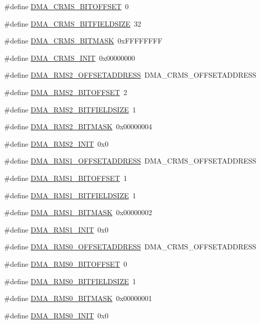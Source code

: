 \begin{DoxyCompactItemize}
\#define \hyperlink{a00547_af2bcab329158e22243dd9ad3b44debd0}{DMA\_\-CRMS\_\-BITOFFSET}~0
\item 
\#define \hyperlink{a00547_a2e7e27db7c47366e6c23b0c3d98e7426}{DMA\_\-CRMS\_\-BITFIELDSIZE}~32
\item 
\#define \hyperlink{a00547_a3caa1ec0922839b9befe7c804a7a4e7b}{DMA\_\-CRMS\_\-BITMASK}~0xFFFFFFFF
\item 
\#define \hyperlink{a00547_a2ed4d76d0f76f21be3cadc602c0a1125}{DMA\_\-CRMS\_\-INIT}~0x00000000
\item 
\#define \hyperlink{a00547_a4963a9bfd5c5dd08132f7bfa8da05583}{DMA\_\-RMS2\_\-OFFSETADDRESS}~DMA\_\-CRMS\_\-OFFSETADDRESS
\item 
\#define \hyperlink{a00547_ac40999a5d03946f8f9ae30b9918013a4}{DMA\_\-RMS2\_\-BITOFFSET}~2
\item 
\#define \hyperlink{a00547_a9476c50057bc6010fd8ddc59dcca2b66}{DMA\_\-RMS2\_\-BITFIELDSIZE}~1
\item 
\#define \hyperlink{a00547_a6ffdb406a6ebfe102c8162fe72fcc2af}{DMA\_\-RMS2\_\-BITMASK}~0x00000004
\item 
\#define \hyperlink{a00547_a550649debe6017fa73f1f4b1d788d85d}{DMA\_\-RMS2\_\-INIT}~0x0
\item 
\#define \hyperlink{a00547_adb3fdf021da84959e8e6b79e5005f1fa}{DMA\_\-RMS1\_\-OFFSETADDRESS}~DMA\_\-CRMS\_\-OFFSETADDRESS
\item 
\#define \hyperlink{a00547_a0e0ffe41bd1e2055978844ea0d5ca479}{DMA\_\-RMS1\_\-BITOFFSET}~1
\item 
\#define \hyperlink{a00547_a2410508b4a08a0f86d6a0be09e3b57a5}{DMA\_\-RMS1\_\-BITFIELDSIZE}~1
\item 
\#define \hyperlink{a00547_a7a3dc6c9367c782aef23aef7c763a806}{DMA\_\-RMS1\_\-BITMASK}~0x00000002
\item 
\#define \hyperlink{a00547_acaee22bc62c9866ff41a7b47bcb54355}{DMA\_\-RMS1\_\-INIT}~0x0
\item 
\#define \hyperlink{a00547_aedeb04809cfbf6d0c2dc3bd5d503d470}{DMA\_\-RMS0\_\-OFFSETADDRESS}~DMA\_\-CRMS\_\-OFFSETADDRESS
\item 
\#define \hyperlink{a00547_a6ebf67c449c9c00749228c4f304fb640}{DMA\_\-RMS0\_\-BITOFFSET}~0
\item 
\#define \hyperlink{a00547_aa01b985a3b6babbd3ec5c020fe03662a}{DMA\_\-RMS0\_\-BITFIELDSIZE}~1
\item 
\#define \hyperlink{a00547_af253ac96297350671140c674f6c04b98}{DMA\_\-RMS0\_\-BITMASK}~0x00000001
\item 
\#define \hyperlink{a00547_ac4aee16fc5d09a3013a79bfe80dd0679}{DMA\_\-RMS0\_\-INIT}~0x0

\end{DoxyCompactItemize}
